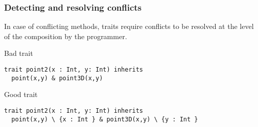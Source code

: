 \documentclass{beamer}
\begin{document}
\begin{frame}[fragile]
  \frametitle{Detecting and resolving conflicts}

  In case of conflicting methods, traits require conflicts to be resolved at the
  level of the composition by the programmer.

  \begin{alertblock}{Bad trait}
\begin{lstlisting}
trait point2(x : Int, y: Int) inherits
  point(x,y) & point3D(x,y)
\end{lstlisting}

  \end{alertblock}

  \pause

  \begin{exampleblock}{Good trait}
\begin{lstlisting}
trait point2(x : Int, y: Int) inherits
  point(x,y) \ {x : Int } & point3D(x,y) \ {y : Int }
\end{lstlisting}

  \end{exampleblock}

\end{frame}
\end{document}
